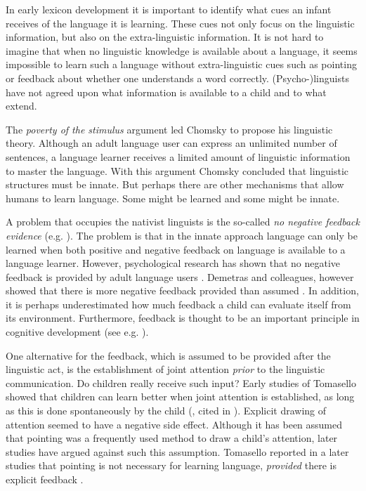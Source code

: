 In early lexicon development it is important to identify what cues an infant receives of the language it is learning. These cues not only focus on the linguistic information, but also on the extra-linguistic information. It is not hard to imagine that when no linguistic knowledge is available about a language, it seems impossible to learn such a language without extra-linguistic cues such as pointing or feedback about whether one understands a word correctly. (Psycho-)linguists have not agreed upon what information is available to a child and to what extend.

The {\em poverty of the stimulus} argument led Chomsky to propose his linguistic theory. Although an adult language user can express an unlimited number of sentences, a language learner receives a limited amount of linguistic information to master the language. With this argument Chomsky concluded that linguistic structures must be innate. But perhaps there are other mechanisms that allow humans to learn language. Some might be learned and some might be innate.


A problem that occupies the nativist linguists is the so-called {\em no negative feedback evidence} (e.g. \citealt{bowerman:1988}). The problem is that in the innate approach language can only be learned when both positive and negative feedback on language is available to a language learner. However, psychological research has shown that no negative feedback is provided by adult language users \citep{braine:1971}. Demetras and colleagues, however showed that there is more negative feedback provided than assumed \citep{demetrasetal:1986}. In addition, it is perhaps underestimated how much feedback a child can evaluate itself from its environment. Furthermore, feedback is thought to be an important principle in cognitive development (see e.g. \citealt{clancey:1997}).


One alternative for the feedback, which is assumed to be provided after the linguistic act, is the establishment of joint attention {\em prior} to the linguistic communication. Do children really receive such input? Early studies of Tomasello showed that children can learn better when joint attention is established, as long as this is done spontaneously by the child (\citealt{tomaselloetal:1986}, cited in \citealt{barrett:1995}). Explicit drawing of attention seemed to have a negative side effect. Although it has been assumed that pointing was a frequently used method to draw a child's attention, later studies have argued against such this assumption. Tomasello reported in a later studies that pointing is not necessary for learning language, {\em provided} there is explicit feedback \citep{tomasellobarton:1994}. 

